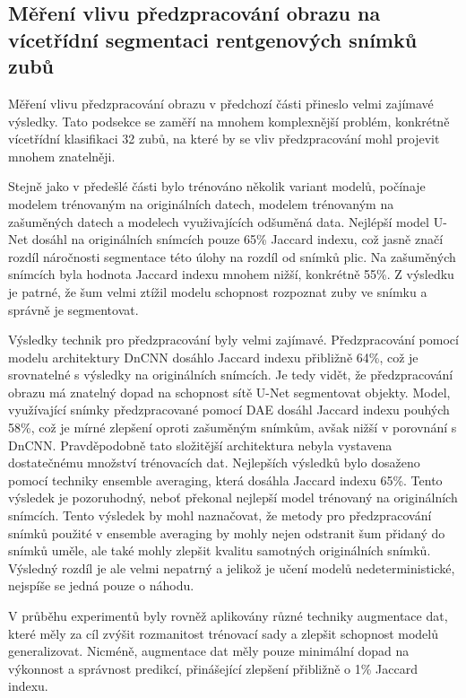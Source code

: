 \documentclass[male,czech,api_ing]{thesis}
\begin{document}
\subsection{Měření vlivu předzpracování obrazu na vícetřídní segmentaci rentgenových snímků zubů}
Měření vlivu předzpracování obrazu v předchozí části přineslo velmi zajímavé výsledky. Tato podsekce se zaměří na mnohem komplexnější problém, konkrétně vícetřídní klasifikaci 32 zubů, na které by se vliv předzpracování mohl projevit mnohem znatelněji.

Stejně jako v předešlé části bylo trénováno několik variant modelů, počínaje modelem trénovaným na originálních datech, modelem trénovaným na zašuměných datech a modelech využivajících odšuměná data. Nejlépší model U-Net dosáhl na originálních snímcích pouze 65\% Jaccard indexu, což jasně značí rozdíl náročnosti segmentace této úlohy na rozdíl od snímků plic. Na zašuměných snímcích byla hodnota Jaccard indexu mnohem nižší, konkrétně 55\%. Z výsledku je patrné, že šum velmi ztížil modelu schopnost rozpoznat zuby ve snímku a správně je segmentovat.

Výsledky technik pro předzpracování byly velmi zajímavé. Předzpracování pomocí modelu architektury DnCNN dosáhlo Jaccard indexu přibližně 64\%, což je srovnatelné s výsledky na originálních snímcích. Je tedy vidět, že předzpracování obrazu má znatelný dopad na schopnost sítě U-Net segmentovat objekty. Model, využívající snímky předzpracované pomocí DAE dosáhl Jaccard indexu pouhých 58\%, což je mírné zlepšení oproti zašuměným snímkům, avšak nižší v porovnání s DnCNN. Pravděpodobně tato složitější architektura nebyla vystavena dostatečnému množství trénovacích dat. Nejlepších výsledků bylo dosaženo pomocí techniky ensemble averaging, která dosáhla Jaccard indexu 65\%. Tento výsledek je pozoruhodný, neboť překonal nejlepší model trénovaný na originálních snímcích. Tento výsledek by mohl naznačovat, že metody pro předzpracování snímků použité v ensemble averaging by mohly nejen odstranit šum přidaný do snímků uměle, ale také mohly zlepšit kvalitu samotných originálních snímků. Výsledný rozdíl je ale velmi nepatrný a jelikož je učení modelů nedeterministické, nejspíše se jedná pouze o náhodu.

V průběhu experimentů byly rovněž aplikovány různé techniky augmentace dat, které měly za cíl zvýšit rozmanitost trénovací sady a zlepšit schopnost modelů generalizovat. Nicméně, augmentace dat měly pouze minimální dopad na výkonnost a správnost predikcí, přinášející zlepšení přibližně o 1\% Jaccard indexu.
\end{document}
